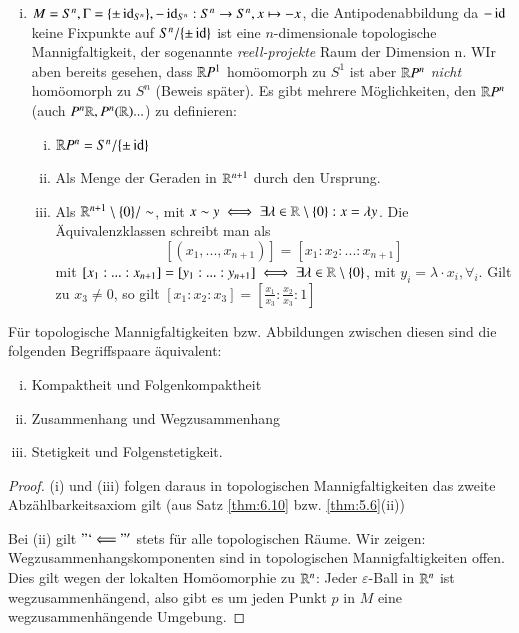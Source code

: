 \documentclass[a4paper,10pt]{scrartcl}
\newcommand{\eps}{\varepsilon}
\begin{document}
\begin{exs*}
 \begin{enumerate}[(i)]
  \item $M=S^n, \Gamma=\{\pm \operatorname{id}_{S^n}\}, -\operatorname{id}_{S^n}: S^n\to S^n, x\mapsto -x$, die Antipodenabbildung da $-\operatorname{id}$ keine Fixpunkte 
auf $S^n/\{\pm \operatorname{id}\}$ ist eine $n$-dimensionale topologische Mannigfaltigkeit,
 der sogenannte \emph{reell-projekte} Raum der Dimension n. WIr aben bereits gesehen, 
dass $\mathbb{R} P^1$ homöomorph zu $S^1$ ist aber $\mathbb{R} P^n$ \emph{nicht} homöomorph zu $S^n$ (Beweis später). Es gibt mehrere Möglichkeiten, den $\mathbb{R} P^n$ (auch $P^n \mathbb{R}, P^n(\mathbb{R})...$) zu definieren:
\begin{enumerate}[(i)]
\item $\mathbb{R} P^n=S^n/\{\pm\operatorname{id}\}$ 
\item Als Menge der Geraden in $\mathbb{R}^{n+1}$ durch den Ursprung.
\item Als $\mathbb{R}^{n+1}\setminus \{0\}/\sim$, mit $x\sim y \iff \exists \lambda\in \mathbb{R}\setminus\{0\}: x=\lambda y$. Die Äquivalenzklassen schreibt man als 
\[
[(x_1,...,x_{n+1})]=[x_1:x_2:...: x_{n+1}] 
\]
mit $[x_1:...:x_{n+1}]=[y_1:...:y_{n+1}]\iff \exists \lambda\in \mathbb{R}\setminus\{0\}$, mit $y_i=\lambda\cdot x_i, \forall_i$.
Gilt zu $x_3\neq 0$, so gilt $[x_1:x_2:x_3]=[\frac{x_1}{x_3}:\frac{x_2}{x_3}:1]$\\
\fixme[fig34]
\end{enumerate}  
\end{enumerate}
\end{exs*}
\begin{st}
 Für topologische Mannigfaltigkeiten bzw. Abbildungen zwischen diesen sind die folgenden Begriffspaare äquivalent:
\begin{enumerate}[(i)]
 \item Kompaktheit und Folgenkompaktheit
 \item Zusammenhang und Wegzusammenhang
 \item Stetigkeit und Folgenstetigkeit.
\end{enumerate}
\end{st}
\fixme[fig35]
\begin{proof}
 (i) und (iii) folgen daraus in topologischen Mannigfaltigkeiten das zweite Abzählbarkeitsaxiom gilt (aus Satz \ref{thm:6.10} bzw. \ref{thm:5.6}(ii))

Bei (ii) gilt $"`\Longleftarrow"'$ stets für alle topologischen Räume. Wir zeigen: Wegzusammenhangskomponenten sind in topologischen Mannigfaltigkeiten offen. Dies gilt wegen der lokalten Homöomorphie zu $\mathbb{R}^n$:
Jeder $\eps$-Ball in $\mathbb{R}^n$ ist wegzusammenhängend, also gibt es um jeden Punkt $p$ in $M$ eine wegzusammenhängende Umgebung.
\end{proof}
\end{document}
